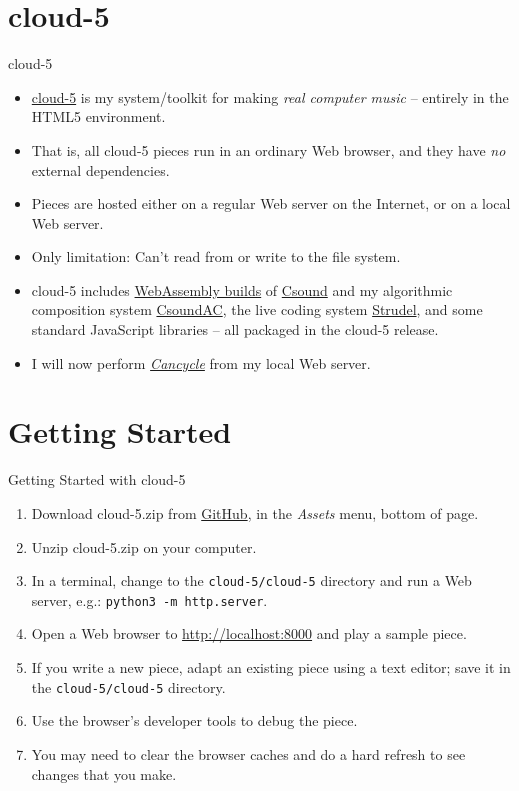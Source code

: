 \documentclass{beamer}
\begin{document}
\section{cloud-5}
\begin{frame}{cloud-5}

\begin{itemize}
\item \href{https://gogins.github.io/cloud-5.html}{cloud-5} is my system/toolkit for making \emph{real computer music} -- entirely in the HTML5 environment.
\item That is, all cloud-5 pieces run in an ordinary Web browser, and they have \emph{no} external dependencies.
\item Pieces are hosted either on a regular Web server on the Internet, or on a local Web server.
\item Only limitation: Can't read from or write to the file system.
\item cloud-5 includes \href{https://github.com/gogins/csound-wasm}{WebAssembly builds} of \href{http://csound.github.io}{Csound} and my algorithmic composition system \href{https://github.com/gogins/csound-ac}{CsoundAC}, the live coding system \href{https://github.com/tidalcycles/strudel}{Strudel}, and some standard JavaScript libraries -- all packaged in the cloud-5 release.
\item I will now perform \href{http://localhost:8000/cancycle.html}{\emph{Cancycle}} from my local Web server.
\end{itemize}

\end{frame}

\section{Getting Started}
\begin{frame}{Getting Started with cloud-5}

\begin{enumerate}
\item Download cloud-5.zip from \href{https://github.com/gogins/cloud-5/releases}{GitHub}, in the \emph{Assets} menu, bottom of page.
\item Unzip cloud-5.zip on your computer.
\item In a terminal, change to the \texttt{cloud-5/cloud-5} directory and run a Web server, e.g.: \texttt{python3 -m http.server}.
\item Open a Web browser to \url{http://localhost:8000} and play a sample piece.
\item If you write a new piece, adapt an existing piece using a text editor; save it in the  \texttt{cloud-5/cloud-5} directory.
\item Use the browser's developer tools to debug the piece.
\item You may need to clear the browser caches and do a hard refresh to see changes that you make.
\end{enumerate}

\end{frame}
\end{document}
